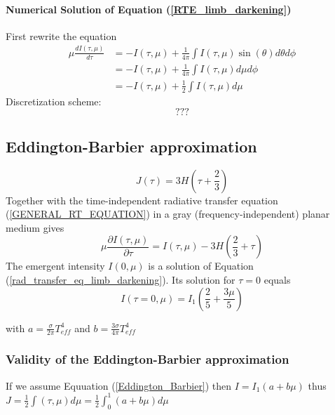 \documentclass[../main/main.tex]{subfiles}
\begin{document}
\paragraph{Numerical Solution of Equation (\ref{RTE_limb_darkening})}
First rewrite the equation
\begin{equation}
\begin{aligned}
\mu \frac{dI(\tau,\mu)}{d\tau} 
&= -I(\tau,\mu)  + \frac{1}{4\pi} \int I(\tau,\mu) \sin(\theta) d\theta d\phi 
\\ &= -I(\tau,\mu)  + \frac{1}{4\pi} \int I(\tau,\mu) d\mu d\phi 
\\ &= -I(\tau,\mu)  + \frac{1}{2} \int I(\tau,\mu) d\mu 
\end{aligned}
\end{equation}
Discretization scheme:
\begin{equation}
???
\end{equation}


\subsection{Eddington-Barbier approximation} 
\begin{equation}
J(\tau) = 3H \left( \tau + \frac{2}{3} \right)
\label{Eddington_Barbier}
\end{equation}
Together with the time-independent radiative transfer equation (\ref{GENERAL_RT_EQUATION}) in a gray (frequency-independent) planar medium gives \begin{equation}
\mu \frac{\partial I(\tau,\mu)}{\partial \tau} = I(\tau,\mu) - 3H\left(\frac{2}{3}+\tau \right)
\label{rad_transfer_eq_limb_darkening}
\end{equation}
The emergent intensity $I(0,\mu)$ is a solution of Equation (\ref{rad_transfer_eq_limb_darkening}). Its solution for $\tau = 0$ equals 
\begin{equation}
I(\tau = 0,\mu) = I_1 \left( \frac{2}{5} + \frac{3 \mu}{5} \right) 
\end{equation}

with $a= \frac{\sigma}{2 \pi}T_{eff}^4$ and $b = \frac{3 \sigma}{4 \pi}T_{eff}^4$

\subsubsection{Validity of the Eddington-Barbier approximation}
\label{validity_eddington}

If we assume Equuation (\ref{Eddington_Barbier}) then $I = I_1(a+b\mu)$ thus $J = \frac{1}{2} \int(\tau,\mu) d\mu = \frac{1}{2} \int_0^1 (a+b\mu)d\mu $
\end{document}
